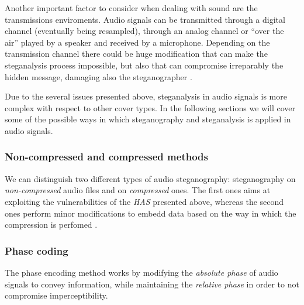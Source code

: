 \documentclass[../../main.tex]{subfiles}
\begin{document}
    Another important factor to consider when dealing with sound are the
    transmissions enviroments.
    Audio signals can be transmitted through a digital channel (eventually being
    resampled), through an analog channel or ``over the air'' played by a
    speaker and received by a microphone.
    Depending on the transmission channel there could be huge modification that
    can make the steganalysis process impossible, but also that can compromise
    irreparably the hidden message, damaging also the steganographer
    \cite{techniques-data-hiding}.

    Due to the several issues presented above, steganalysis in audio signals is
    more complex with respect to other cover types.
    In the following sections we will cover some of the possible ways in which
    steganography and steganalysis is applied in audio signals.

    \subsubsection{Non-compressed and compressed methods}
    We can distinguish two different types of audio steganography: steganography
    on \emph{non-compressed} audio files and on \emph{compressed} ones.
    The first ones aims at exploiting the vulnerabilities of the \emph{HAS}
    presented above, whereas the second ones perform minor modifications to
    embedd data based on the way in which the compression is perfomed
    \cite{review-audio-steganalysis}.

    \subsubsection{Phase coding}
    The phase encoding method works by modifying the \emph{absolute phase} of
    audio signals to convey information, while maintaining the \emph{relative
    phase} in order to not compromise imperceptibility.
\end{document}
